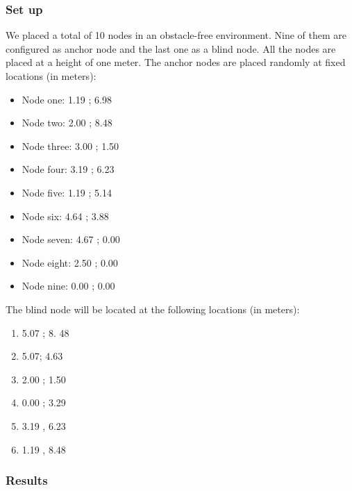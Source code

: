 \subsubsection{Set up}
We placed a total of 10 nodes in an obstacle-free environment. Nine of them are configured as anchor node and the last one as a blind node. All the nodes are placed at a height of one meter.
The anchor nodes are placed randomly at fixed locations (in meters):
\begin{itemize}
	\item Node one: 1.19  ; 6.98
	\item Node two: 2.00 ; 8.48
	\item Node three: 3.00 ; 1.50
	\item Node four: 3.19 ; 6.23
	\item Node five: 1.19 ; 5.14
	\item Node six: 4.64 ; 3.88
	\item Node seven: 4.67 ; 0.00
	\item Node eight: 2.50 ; 0.00
	\item Node nine: 0.00 ; 0.00
\end{itemize}
The blind node will be located at the following locations (in meters):
\begin{enumerate}
	\item 5.07 ; 8. 48
	\item 5.07; 4.63
	\item 2.00 ; 1.50
	\item 0.00 ; 3.29
	\item 3.19 , 6.23
	\item 1.19 , 8.48
\end{enumerate}
\subsubsection{Results}